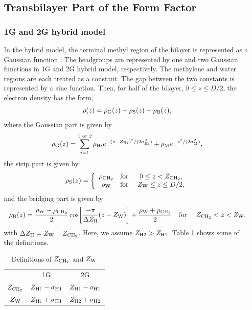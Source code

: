 \subsection{Transbilayer Part of the Form Factor}\label{sec:transbilayer}
\subsubsection{1G and 2G hybrid model}
In the hybrid model, the terminal methyl region of the bilayer is represented
as a Gaussian function \cite{ref:Wiener89}. The headgroups are represented by one 
and two Gaussian
functions in 1G and 2G hybrid model, respectively. The methylene and water 
regions are each treated as a constant. The gap between the two constants is 
represented by a sine function. Then, for half of the bilayer, 
$0 \leq z \leq D/2$, the electron density has the form, 
\begin{equation}
  \rho(z) = \rho_\mathrm{G}(z) + \rho_\mathrm{S}(z) + \rho_\mathrm{B}(z),
\end{equation}
where the Gaussian part is given by 
\begin{equation}
  \rho_\mathrm{G}(z) = \sum_{i=1}^{1\text{ or }2} \rho_{\mathrm{H}i}
             e^{-(z-Z_{\mathrm{H}i})^2/(2\sigma_{\mathrm{H}i}^2)} + \rho_\mathrm{M} e^{-z^2/(2\sigma_\mathrm{M}^2)},
\end{equation}
the strip part is given by
\begin{equation}
  \rho_\mathrm{S}(z) = \left\{
    \begin{array}{ccc}
      \rho_\mathrm{CH_2} & \text{for } & 0 \leq z < Z_\mathrm{CH_2}, \\
      \rho_\mathrm{W}   & \text{for } & Z_\mathrm{W} \leq z \leq D/2,
    \end{array}
  \right.
\end{equation}
and the bridging part is given by
\begin{equation}
  \rho_\mathrm{B}(z) = \frac{\rho_\mathrm{W}-\rho_\mathrm{CH_2}}{2} \cos \mathopen{}\left[ 
    \frac{-\pi}{\Delta Z_\mathrm{H}}(z-Z_\mathrm{W}) \right]\mathclose{} + \frac{\rho_\mathrm{W}+\rho_\mathrm{CH_2}}{2} \\
  \text{\quad for \quad} Z_\mathrm{CH_2} < z < Z_\mathrm{W}.
\end{equation}
with $\Delta Z_\mathrm{H}=Z_\mathrm{W}-Z_\mathrm{CH_2}$. Here, we assume $Z_{\mathrm{H}2}>Z_{\mathrm{H}1}$. 
Table \ref{tb:zchtwozw} shows some of the definitions.

\begin{table}[htb]
  \centering
  \begin{tabular}{c c c}
     & 1G & 2G \\
    $Z_\mathrm{CH_2}$ & $Z_{\mathrm{H}1}-\sigma_{\mathrm{H}1}$ & $Z_{\mathrm{H}1}-\sigma_{\mathrm{H}1}$ \\
    $Z_\mathrm{W}$ & $Z_{\mathrm{H}1}+\sigma_{\mathrm{H}1}$ & $Z_{\mathrm{H}2}+\sigma_{\mathrm{H}2}$   
  \end{tabular}
  \caption{Definitions of $Z_\mathrm{CH_2}$ and $Z_\mathrm{W}$}
  \label{tb:zchtwozw}
\end{table}

